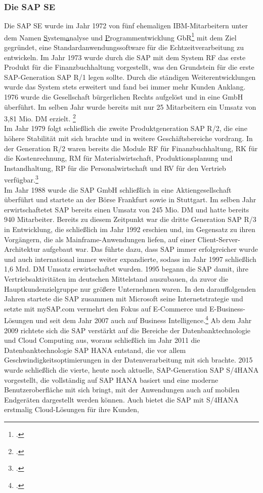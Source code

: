 \subsubsection{Die SAP SE}
Die SAP SE wurde im Jahr 1972 von fünf ehemaligen IBM-Mitarbeitern unter dem Namen \glqq{}\underline{S}ystem\underline{a}nalyse und \underline{P}rogrammentwicklung GbR\grqq{}\footcite[Vgl.][]{think-ing}  mit dem Ziel gegründet, eine Standardanwendungssoftware für die Echtzeitverarbeitung zu entwickeln.  Im Jahr 1973 wurde durch die SAP mit dem \glqq{}System RF\grqq{} das erste Produkt für die Finanzbuchhaltung vorgestellt, was den Grundstein für die erste SAP-Generation \glqq{}SAP R/1\grqq{} legen sollte. Durch die ständigen Weiterentwicklungen wurde das System stets erweitert und fand bei immer mehr Kunden Anklang. 1976 wurde die Gesellschaft bürgerlichen Rechts aufgelöst und in eine GmbH überführt. Im selben Jahr wurde bereits mit nur 25 Mitarbeitern ein Umsatz von 3,81 Mio. DM erzielt. \footcite[Vgl.][]{sap-fruehejahre}\\Im Jahr 1979 folgt schließlich die zweite Produktgeneration \glqq{}SAP R/2\grqq{}, die eine höhere Stabilität mit sich brachte und in weitere Geschäftsbereiche vordrang. In der Generation R/2 waren bereits die Module RF für Finanzbuchhaltung, RK für die Kostenrechnung, RM für Materialwirtschaft, Produktionsplanung und Instandhaltung, RP für die Personalwirtschaft und RV für den Vertrieb verfügbar.\footcite[Vgl.][]{bewerbungsratgeber}\\Im Jahr 1988 wurde die SAP GmbH schließlich in eine Aktiengesellschaft überführt und startete an der Börse Frankfurt sowie in Stuttgart. Im selben Jahr erwirtschaftetet SAP bereits einen Umsatz von 245 Mio. DM und hatte bereits 940 Mitarbeiter. Bereits zu diesem Zeitpunkt war die dritte Generation \glqq{}SAP R/3\grqq{} in Entwicklung, die schließlich im Jahr 1992 erschien und, im Gegensatz zu ihren Vorgängern, die als Mainframe-Anwendungen liefen, auf einer Client-Server-Architektur aufgebaut war. Das führte dazu, dass SAP immer erfolgreicher wurde und auch international immer weiter expandierte, sodass im Jahr 1997 schließlich 1,6 Mrd. DM  Umsatz erwirtschaftet wurden. 1995 begann die SAP damit, ihre Vertriebsaktivitäten im deutschen Mittelstand auszubauen, da zuvor die Hauptkundenzielgruppe nur größere Unternehmen waren. In den darauffolgenden Jahren startete die SAP zusammen mit Microsoft seine Internetstrategie und setzte mit \glqq{}mySAP.com\grqq{} vermehrt den Fokus auf E-Commerce und E-Business-Lösungen und seit dem Jahr 2007 auch auf Business Intelligence.\footcite[Vgl.][]{sap-fruehejahre} Ab dem Jahr 2009 richtete sich die SAP verstärkt auf die Bereiche der Datenbanktechnologie und Cloud Computing aus, woraus schließlich im Jahr 2011 die Datenbanktechnologie \glqq{}SAP HANA\grqq{} entstand, die vor allem Geschwindigkeitsoptimierungen in der Datenverarbeitung mit sich brachte. 2015 wurde schließlich die vierte, heute noch aktuelle, SAP-Generation \glqq{}SAP S/4HANA\grqq{} vorgestellt, die vollständig auf SAP HANA basiert und eine moderne Benutzeroberfläche mit sich bringt, mit der Anwendungen auch auf mobilen Endgeräten dargestellt werden können. Auch bietet die SAP mit S/4HANA erstmalig Cloud-Lösungen für ihre Kunden, 